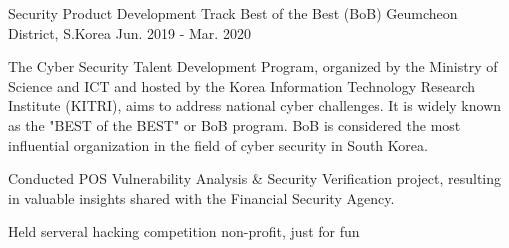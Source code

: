 

\begin{cventries}

  \cventry
    {Security Product Development Track} %
    {Best of the Best (BoB)} %
    {Geumcheon District, S.Korea} %
    {Jun. 2019 - Mar. 2020} %
    {
      \begin{cvitems} %
        \item {The Cyber Security Talent Development Program, organized by the Ministry of Science and ICT and hosted by the Korea Information Technology Research Institute (KITRI), aims to address national cyber challenges. It is widely known as the "BEST of the BEST" or BoB program. BoB is considered the most influential organization in the field of cyber security in South Korea.}
        \item {Conducted POS Vulnerability Analysis \& Security Verification project, resulting in valuable insights shared with the Financial Security Agency.}
        \item {Held serveral hacking competition non-profit, just for fun}
      \end{cvitems}
    }

\end{cventries}
